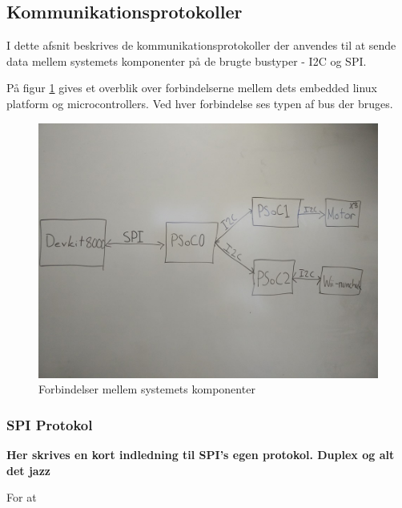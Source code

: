 \subsection{Kommunikationsprotokoller}

I dette afsnit beskrives de kommunikationsprotokoller der anvendes til at sende data mellem systemets komponenter på de brugte bustyper - I2C og SPI.

På figur \ref{fig:kommunikationsOverblik} gives et overblik over forbindelserne mellem dets embedded linux platform og microcontrollers. Ved hver forbindelse ses typen af bus der bruges.

\begin{figure}[H]
	\centering
	\includegraphics[width=\textwidth] {Systemarkitektur/images/overordnetstruktur}
	\caption{Forbindelser mellem systemets komponenter}
	\label{fig:kommunikationsOverblik}
\end{figure}

\subsubsection{SPI Protokol}

\textbf{Her skrives en kort indledning til SPI's egen protokol. Duplex og alt det jazz}

For at 


